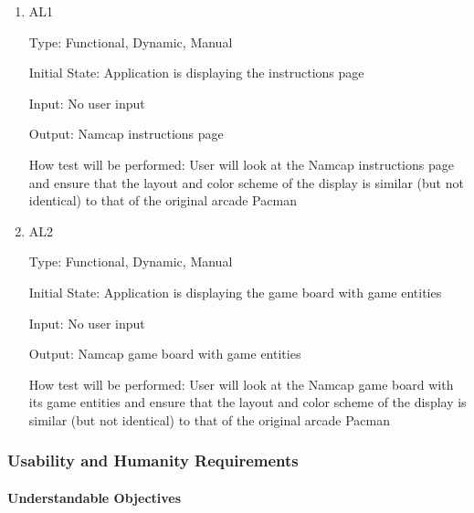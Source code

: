\documentclass[12pt, titlepage]{article}
\begin{document}
\begin{enumerate}

\item{AL1\\}

Type: Functional, Dynamic, Manual
					
Initial State: Application is displaying the instructions page
					
Input: No user input
					
Output: Namcap instructions page
					
How test will be performed: User will look at the Namcap instructions page and ensure that the layout and color scheme of the display is similar (but not identical) to that of the original arcade Pacman
					
\item{AL2\\}

Type: Functional, Dynamic, Manual
					
Initial State: Application is displaying the game board with game entities
					
Input: No user input
					
Output: Namcap game board with game entities
					
How test will be performed: User will look at the Namcap game board with its game entities and ensure that the layout and color scheme of the display is similar (but not identical) to that of the original arcade Pacman

\end{enumerate}

\subsubsection{Usability and Humanity Requirements}

\paragraph{Understandable Objectives}
\end{document}
